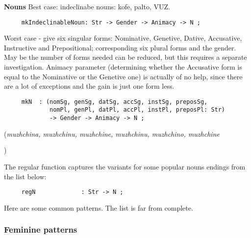 \textbf{Nouns}
Best case: indeclinabe nouns: {\cyr kofe}, {\cyr
pal\cyrsftsn{}to}, {\cyr VUZ}.
\begin{verbatim}
     mkIndeclinableNoun: Str -> Gender -> Animacy -> N ;
\end{verbatim}

Worst case - give six singular forms:
Nominative, Genetive, Dative, Accusative, Instructive and Prepositional;
corresponding six plural forms and the gender.
May be the number of forms needed can be reduced,
but this requires a separate investigation.
Animacy parameter (determining whether the Accusative form is equal
to the Nominative or the Genetive one) is actually of no help,
since there are a lot of exceptions and the gain is just one form less.
\begin{verbatim}
     mkN  : (nomSg, genSg, datSg, accSg, instSg, preposSg,
             nomPl, genPl, datPl, accPl, instPl, preposPl: Str)
             -> Gender -> Animacy -> N ;
\end{verbatim}
({\cyr \em muzhchina, muzhchinu, muzhchine, muzhchinu,
muzhchino\cyrishrt{}, muzhchine}

)

\vspace{5mm}

The regular function captures the variants for some popular nouns
endings from the list below:
\begin{verbatim}
     regN             : Str -> N ;
\end{verbatim}

Here are some common patterns. The list is far from complete.

\subsubsection{Feminine patterns}

